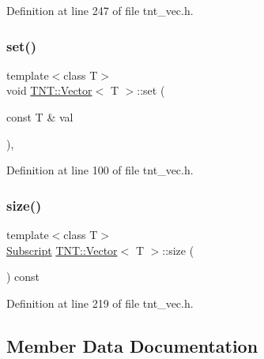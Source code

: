 Definition at line 247 of file tnt\+\_\+vec.\+h.

\mbox{\label{classTNT_1_1Vector_a6e6f148d1889821389e560ce4a213ac8}} 
\subsubsection{\texorpdfstring{set()}{set()}}
{\footnotesize\ttfamily template$<$class T$>$ \\
void \hyperlink{classTNT_1_1Vector}{T\+N\+T\+::\+Vector}$<$ T $>$\+::set (\begin{DoxyParamCaption}\item[{const T \&}]{val }\end{DoxyParamCaption})\hspace{0.3cm}{\ttfamily [inline]}, {\ttfamily [protected]}}



Definition at line 100 of file tnt\+\_\+vec.\+h.

\mbox{\label{classTNT_1_1Vector_a4d34328baedd5a4f6e3874811569deb0}} 
\subsubsection{\texorpdfstring{size()}{size()}}
{\footnotesize\ttfamily template$<$class T$>$ \\
\hyperlink{namespaceTNT_af22e3f1460e145c04ce4e7d701e4c1c1}{Subscript} \hyperlink{classTNT_1_1Vector}{T\+N\+T\+::\+Vector}$<$ T $>$\+::size (\begin{DoxyParamCaption}{ }\end{DoxyParamCaption}) const\hspace{0.3cm}{\ttfamily [inline]}}



Definition at line 219 of file tnt\+\_\+vec.\+h.



\subsection{Member Data Documentation}
\mbox{\label{classTNT_1_1Vector_accfd20cf0105ad3c153aeebf728f5bbc}} 
